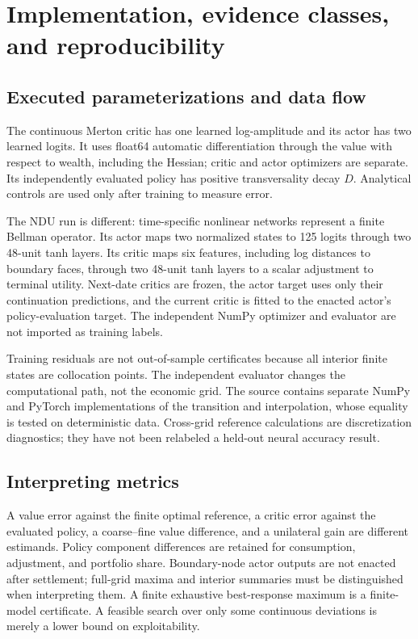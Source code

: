 \section{Implementation, evidence classes, and reproducibility}
\label{app:repro}
\subsection{Executed parameterizations and data flow}
The continuous Merton critic has one learned log-amplitude and its actor has two learned logits. It uses float64 automatic differentiation through the value with respect to wealth, including the Hessian; critic and actor optimizers are separate. Its independently evaluated policy has positive transversality decay $D$. Analytical controls are used only after training to measure error.

The NDU run is different: time-specific nonlinear networks represent a finite Bellman operator. Its actor maps two normalized states to 125 logits through two 48-unit tanh layers. Its critic maps six features, including log distances to boundary faces, through two 48-unit tanh layers to a scalar adjustment to terminal utility. Next-date critics are frozen, the actor target uses only their continuation predictions, and the current critic is fitted to the enacted actor's policy-evaluation target. The independent NumPy optimizer and evaluator are not imported as training labels.

Training residuals are not out-of-sample certificates because all interior finite states are collocation points. The independent evaluator changes the computational path, not the economic grid. The source contains separate NumPy and PyTorch implementations of the transition and interpolation, whose equality is tested on deterministic data. Cross-grid reference calculations are discretization diagnostics; they have not been relabeled a held-out neural accuracy result.

\subsection{Interpreting metrics}
A value error against the finite optimal reference, a critic error against the evaluated policy, a coarse--fine value difference, and a unilateral gain are different estimands. Policy component differences are retained for consumption, adjustment, and portfolio share. Boundary-node actor outputs are not enacted after settlement; full-grid maxima and interior summaries must be distinguished when interpreting them. A finite exhaustive best-response maximum is a finite-model certificate. A feasible search over only some continuous deviations is merely a lower bound on exploitability.

